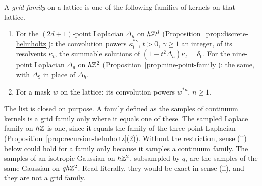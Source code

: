 \begin{definition}
\label{def:grid-family}

A \emph{grid family} on a lattice is one of the following families of kernels on that lattice.
\begin{enumerate}
\item For the $(2d+1)$-point Laplacian $\Delta_h$ on $h\mathbb{Z}^d$
(Proposition~\ref{prop:discrete-helmholtz}): the convolution powers $\kappa_t^{*\gamma}$, $t > 0$,
$\gamma \ge 1$ an integer, of its resolvents $\kappa_t$, the summable solutions of
$(1 - t^2\Delta_h)\kappa_t = \delta_0$. For the nine-point Laplacian $\Delta_9$ on $h\mathbb{Z}^2$
(Proposition~\ref{prop:nine-point-family}): the same, with $\Delta_9$ in place of $\Delta_h$.
\item For a mask $w$ on the lattice: its convolution powers $w^{*n}$, $n \ge 1$.
\end{enumerate}
\end{definition}

The list is closed on purpose. A family defined as the samples of continuum kernels is a grid
family only where it equals one of these. The sampled Laplace family on $h\mathbb{Z}$ is one, since it
equals the family of the three-point Laplacian (Proposition~\ref{prop:recursion-helmholtz}(2)).
Without the restriction, sense (ii) below could hold for a family only because it samples a
continuum family. The samples of an isotropic Gaussian on $h\mathbb{Z}^2$, subsampled by $q$, are the samples of the
same Gaussian on $qh\mathbb{Z}^2$. Read literally, they would be exact in sense (ii), and they are not a
grid family.

